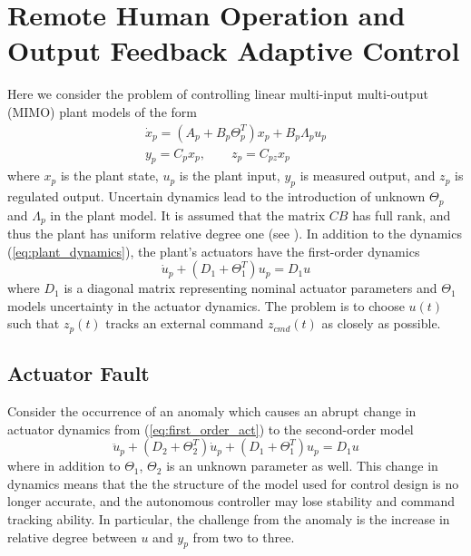 \section{Remote Human Operation and Output Feedback Adaptive Control}  \label{sec:mimo_problem}
Here we consider the problem of controlling linear multi-input multi-output (MIMO) plant models of the form
\begin{equation}
\begin{gathered}
\dot x_p = (A_p + B_p \Theta_p^T) x_p + B_p \Lambda_p u_p \\
y_p = C_p x_p, \qquad z_p = C_{pz} x_p \label{eq:plant_dynamics}
\end{gathered}
\end{equation}
where $x_p$ is the plant state, $u_p$ is the plant input, $y_p$ is measured output, and $z_p$ is regulated output. Uncertain dynamics lead to the introduction of unknown $\Theta_p$ and $\Lambda_p$ in the plant model. It is assumed that the matrix $CB$ has full rank, and thus the plant has uniform relative degree one (see \cite{qu2016adaptive}). In addition to the dynamics (\ref{eq:plant_dynamics}), the plant's actuators have the first-order dynamics
\begin{equation}
	\dot{u}_p + (D_1 + \Theta_1^T) u_p = D_1 u \label{eq:first_order_act}
\end{equation}
where $D_1$ is a diagonal matrix representing nominal actuator parameters and $\Theta_1$ models uncertainty in the actuator dynamics. The problem is to choose $u(t)$ such that $z_p(t)$ tracks an external command $z_{cmd}(t)$ as closely as possible.

\subsection{Actuator Fault} \label{subsec:mimo_act_fault}
Consider the occurrence of an anomaly which causes an abrupt change in actuator dynamics from (\ref{eq:first_order_act}) to the second-order model
\begin{equation}
	\ddot{u}_p + (D_2 + \Theta_2^T) \dot{u}_p + (D_1 + \Theta_1^T) u_p = D_1 u \label{eq:second_order_act}
\end{equation}
where in addition to $\Theta_1$, $\Theta_2$ is an unknown parameter as well. This change in dynamics means that the the structure of the model used for control design is no longer accurate, and the autonomous controller may lose stability and command tracking ability. In particular, the challenge from the anomaly is the increase in relative degree between $u$ and $y_p$ from two to three.

